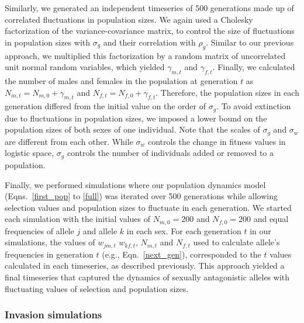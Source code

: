 \documentclass[12pt]{article}
\begin{document}
Similarly, we generated an independent timeseries of 500 generations made up of correlated fluctuations in population sizes.  We again used a Cholesky factorization of the variance-covariance matrix, to control the size of fluctuations in population sizes with $\sigma_{g}$ and their correlation with $\rho_{g}$. Similar to our previous approach, we multiplied this factorization by a random matrix of uncorrelated unit normal random variables, which yielded $\gamma_{m,t}$ and $\gamma_{f,t}$. Finally, we calculated the number of males and females in the population at generation $t$ as $N_{m,t} = N_{m,0} + \gamma_{m,t}$ and $N_{f,t} = N_{f,0}+ \gamma_{f,t} $. Therefore, the population sizes in each generation differed from the initial value on the order of $\sigma_{g}$. To avoid extinction due to fluctuations in population sizes, we imposed a lower bound on the population sizes of both sexes of one individual. Note that the scales of $\sigma_{g}$ and  $\sigma_{w}$ are different from each other. While $\sigma_{w}$ controls the change in fitness values in logistic space, $\sigma_{g}$ controls the number of individuals added or removed to a population.



Finally, we performed simulations where our population dynamics model (Eqns.~\ref{first_pop} to \ref{full}) was iterated over 500 generations while allowing selection values and population sizes to fluctuate in each generation. We started each simulation with the initial values of $N_{m,0}=200$ and $N_{f,0}=200$ and equal frequencies of allele $j$ and allele $k$ in each sex. For each generation $t$ in our simulations, the values of $w_{jm,t}$ $w_{kf,t}$, $N_{m,t}$ and $N_{f,t}$ used to calculate allele's frequencies in generation $t$ (e.g., Eqn.~\ref{next_gen}), corresponded to the $t$ values calculated in each timeseries, as described previously. This approach yielded a final timeseries that captured the dynamics of sexually antagonistic alleles with fluctuating values of selection and population sizes.

\subsubsection*{Invasion simulations}
\end{document}
